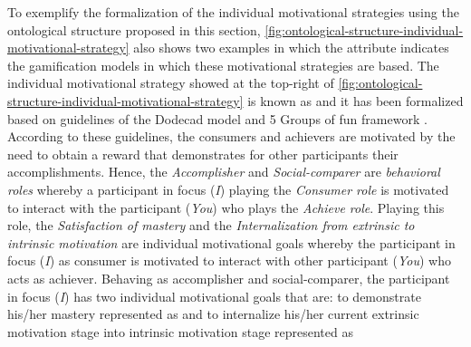 To exemplify the formalization of the individual motivational strategies using the ontological structure proposed in this section, \autoref{fig:ontological-structure-individual-motivational-strategy} also shows two examples in which the attribute  indicates the gamification models in which these motivational strategies are based.
The individual motivational strategy showed at the top-right of \autoref{fig:ontological-structure-individual-motivational-strategy} is known as  and it has been formalized based on guidelines of the Dodecad model \cite{Marczewski2015a} and 5 Groups of fun framework \cite{Marczewski2015b}.
According to these guidelines, the consumers and achievers are motivated by the need to obtain a reward that demonstrates for other participants their accomplishments.
Hence, the \emph{Accomplisher} and \emph{Social-comparer} are \emph{behavioral roles} whereby a participant in focus (\emph{I}) playing the \emph{Consumer role} is motivated to interact with the participant (\emph{You}) who plays the \emph{Achieve role}.
Playing this role, the \emph{Satisfaction of mastery} and the \emph{Internalization from extrinsic to intrinsic motivation} are individual motivational goals whereby the participant in focus (\emph{I}) as consumer is motivated to interact with other participant (\emph{You}) who acts as achiever.
Behaving as accomplisher and social-comparer, the participant in focus (\emph{I}) has two individual motivational goals that are: to demonstrate his/her mastery represented as  and to internalize his/her current extrinsic motivation stage into intrinsic motivation stage represented as 

